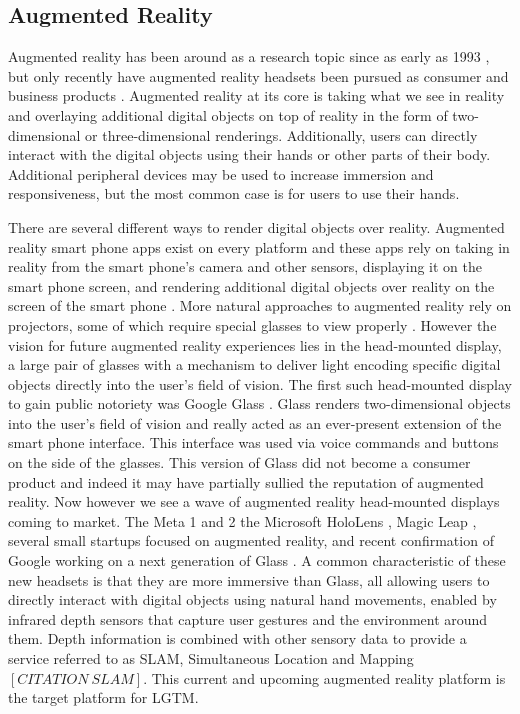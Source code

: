 \documentclass[12pt]{report}
\begin{document}
\subsection{Augmented Reality}
Augmented reality has been around as a research topic since as early as 1993 \cite{RealWorldArWellnet1993}, but only recently have augmented reality headsets been pursued as consumer and business products \cite{MagicLeapWebsite,MetaWebsite,HoloLensWebsite,GoogleGlassWebsite}. Augmented reality at its core is taking what we see in reality and overlaying additional digital objects on top of reality in the form of two-dimensional or three-dimensional renderings. Additionally, users can directly interact with the digital objects using their hands or other parts of their body. Additional peripheral devices may be used to increase immersion and responsiveness, but the most common case is for users to use their hands. \par

There are several different ways to render digital objects over reality. Augmented reality smart phone apps exist on every platform and these apps rely on taking in reality from the smart phone's camera and other sensors, displaying it on the smart phone screen, and rendering additional digital objects over reality on the screen of the smart phone \cite{LayarArApp,GoogleTranslate,IonRoadArApp}. More natural approaches to augmented reality rely on projectors, some of which require special glasses to view properly \cite{VtCubeWebsite}. However the vision for future augmented reality experiences lies in the head-mounted display, a large pair of glasses with a mechanism to deliver light encoding specific digital objects directly into the user's field of vision. The first such head-mounted display to gain public notoriety was Google Glass \cite{GoogleGlassWebsite}. Glass renders two-dimensional objects into the user's field of vision and really acted as an ever-present extension of the smart phone interface. This interface was used via voice commands and buttons on the side of the glasses. This version of Glass did not become a consumer product and indeed it may have partially sullied the reputation of augmented reality. Now however we see a wave of augmented reality head-mounted displays coming to market. The Meta 1 and 2 \cite{MetaWebsite} the Microsoft HoloLens \cite{HoloLensWebsite}, Magic Leap \cite{MagicLeapWebsite}, several small startups focused on augmented reality, and recent confirmation of Google working on a next generation of Glass \cite{WiredGoogleGlassNextGen2015}. A common characteristic of these new headsets is that they are more immersive than Glass, all allowing users to directly interact with digital objects using natural hand movements, enabled by infrared depth sensors that capture user gestures and the environment around them. Depth information is combined with other sensory data to provide a service referred to as SLAM, Simultaneous Location and Mapping $[CITATION \: SLAM]$. This current and upcoming augmented reality platform is the target platform for LGTM. \par
\end{document}
